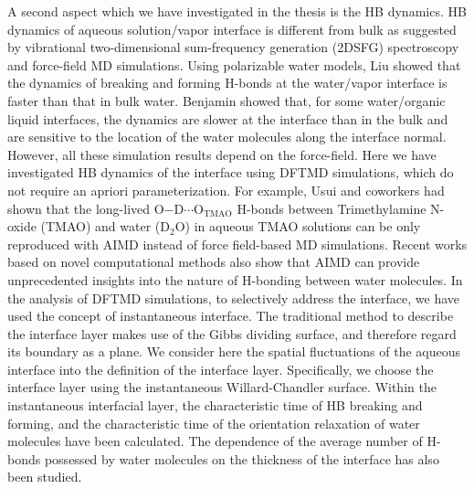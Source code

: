 A second aspect which we have investigated in the thesis is the HB dynamics. 
HB dynamics of aqueous solution/vapor interface is different from bulk as suggested by 
vibrational two-dimensional sum-frequency generation (2DSFG) spectroscopy\cite{Asbury2004,Eaves2005,Loparo2006b,Auer2007,Nicodemus2010,Ramasesha2011,NiYicun2012} 
and force-field MD simulations\cite{Luzar1996,AL00,LiuPu2005}. 
Using polarizable water models, Liu \etal\cite{LiuPu2005} showed that
the dynamics of breaking and forming H-bonds at the water/vapor interface is faster than that in bulk water. 
Benjamin\cite{Benjamin2005} showed that, for some water/organic liquid interfaces, the dynamics are slower at the interface 
than in the bulk and are sensitive to the location of the water molecules along the interface normal.
However, all these simulation results depend on the force-field. 
Here we have investigated 
HB dynamics of the interface using DFTMD simulations, which do not require an apriori parameterization.
For example, Usui and coworkers\cite{Usui2015} had shown 
that the long-lived O−D$\cdots$O$_{\text{TMAO}}$ H-bonds between Trimethylamine N-oxide (TMAO) and water (D$_2$O) in aqueous TMAO solutions 
can be only reproduced with AIMD instead of force field-based MD simulations. Recent works based on novel \abinitio 
computational methods\cite{Kuehne2007,Mallik2008,Berkelbach2009,Khaliullin2013}
also show that AIMD can provide unprecedented insights into the nature of H-bonding between water molecules.  
%
In the analysis of DFTMD simulations, to selectively address the interface, we 
have used the concept of instantaneous interface. 
The traditional method to describe the interface layer makes use of the Gibbs dividing surface, and therefore regard its boundary as a plane.
We consider here the spatial fluctuations of the aqueous interface into the definition of the interface layer. 
Specifically, we choose the interface layer using the instantaneous Willard-Chandler surface. 
Within the instantaneous interfacial layer, the characteristic time of HB breaking and forming, 
and the characteristic time of the orientation relaxation of water molecules have been calculated. 
The dependence of the average number of H-bonds possessed by water molecules 
on the thickness of the interface has also been studied. 

